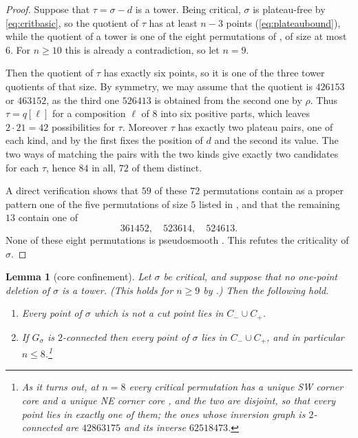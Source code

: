 \documentclass[12pt]{article}
\def\xspace{ }%
\newtheorem{lemma}[lemma]{Lemma}
\theoremstyle{definition}
\newcommand{\psm}{pseudosmooth\xspace}
\newcommand{\wo}{w_0}                 %
\newcommand{\rc}{\rho}                %
\newcommand{\Wcr}{W\xspace}    %
\newcommand{\Ncr}{N\xspace}    %
\newcommand{\Scr}{S\xspace}    %
\newcommand{\Ecr}{E\xspace}    %
\newcommand{\SWcr}{SW\xspace}  %
\newcommand{\NEcr}{NE\xspace}  %
\newcommand{\core}{corner core\xspace}
\newcommand{\Cm}{C_{-}}
\newcommand{\Cp}{C_{+}}
\newcommand{\igr}{G}                      %
\begin{document}
\begin{proof}
Suppose that $\tau = \sigma - d$ is a tower. Being critical, $\sigma$ is
plateau-free by \eqref{eq:critbasic}, so the quotient of $\tau$ has at
least $n-3$ points (\eqref{eq:plateaubound}), while the quotient of a
tower is one of the eight permutations of , of size at
most $6$. For $n \ge 10$ this is already a contradiction, so let $n = 9$.

Then the quotient of $\tau$ has exactly six points, so it is one of the
three tower quotients of that size. By symmetry, we may assume that the
quotient is $426153$ or $463152$, as the third one $526413$ is obtained
from the second one by $\rc$. Thus $\tau = q[\ell]$ for a composition
$\ell$ of $8$ into six positive parts, which leaves $2 \cdot 21 = 42$
possibilities for $\tau$. Moreover $\tau$ has exactly two plateau pairs,
one of each kind, and by  the first fixes the
position of $d$ and the second its value. The two ways of matching the
pairs with the two kinds give exactly two candidates for each $\tau$,
hence $84$ in all, $72$ of them distinct.

A direct verification shows that $59$ of these $72$ permutations contain
as a proper pattern one of the five permutations of size $5$ listed in
, and that the remaining $13$ contain one of
\[
   361452,\quad 523614,\quad 524613 .
\]
None of these eight permutations is \psm. This refutes the criticality of $\sigma$.
\end{proof}

\begin{lemma}[core confinement]\label{lem:coreconf}
Let $\sigma$ be critical, and suppose that no one-point deletion of $\sigma$ is a tower.
(This holds for $n\ge9$ by .)
Then the following hold.
\begin{enumerate}
\item\label{cc:conf} Every point of $\sigma$ which is not a cut point lies in
$\Cm \cup \Cp$.
\item\label{cc:not2} If $\igr_\sigma$ is $2$-connected then every point of
$\sigma$ lies in $\Cm \cup \Cp$, and in particular $n \le 8$.\footnote{As it turns out, at $n = 8$ every critical permutation has a
unique \SWcr \core{} and a unique \NEcr \core, and the two are disjoint, so that every point lies in exactly one of them;
the ones whose inversion graph is $2$-connected are $42863175$ and its
inverse $62518473$.}
\end{enumerate}
\end{lemma}
\end{document}
